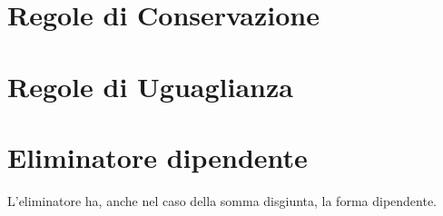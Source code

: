 \section{Regole di Conservazione}
\label{subsec: conservazione-disjointsum}
\small
\begin{adjustwidth}{-5em}{}
\begin{prooftree}
\end{prooftree}
\end{adjustwidth}
\small
\begin{adjustwidth}{-5em}{}
\begin{prooftree}
\end{prooftree}
\end{adjustwidth}


\section{Regole di Uguaglianza}
\label{subsec: uguaglianza-disjointsum}
\normalsize
\begin{prooftree}
\end{prooftree}

\section{Eliminatore dipendente}
\label{subsec:eliminatore dipendente-disjointsum}
L'eliminatore ha, anche nel caso della somma disgiunta, la forma dipendente.
\small
\begin{adjustwidth}{-5em}{}
\begin{prooftree}
\end{prooftree}
\end{adjustwidth}
\normalsize
